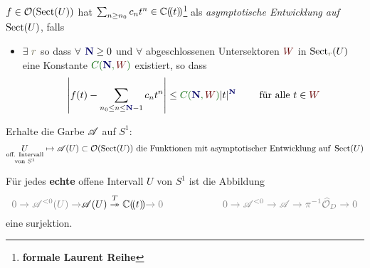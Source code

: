 \begin{defn}
  \def\myN{\textbf{\textcolor{blue!40!black}{N}}}
  \def\mySect{\textcolor{red!40!black}{W}}
  \def\myConst{\textcolor{green!40!black}{C(\myN,\mySect)}}
  $f\in\mathcal{O}(\operatorname{Sect}(U))$
  hat
  $\sum_{n\geq n_0}c_nt^n\in\mathbb{C}(\!(t)\!)$\footnote{\textbf{formale Laurent Reihe}}
  als \emph{asymptotische Entwicklung auf $\operatorname{Sect}(U)$}, falls
  \begin{itemize}
    \item $\exists$ $\textcolor{yellow!30!black}{r}$ so dass
      $\forall$ $\myN\geq0$ und
      $\forall$ abgeschlossenen Untersektoren $\mySect$ in
      $\Sect_{\textcolor{yellow!30!black}{r}}(U)$
      \\eine Konstante $\myConst$ existiert, so dass
      \[
        \left|
          f(t)-\sum_{n_0\leq n\leq\myN-1}c_nt^n
        \right|
        \leq \myConst|t|^{\myN} \qquad \text{ für alle } t\in \mySect
      \]

      \begin{comment}
        oder äquivalent:
        $\lim_{z\to0,z\in{\mySect}}|t|^{-(\myN-1)}
          \left|
            f(t)-\sum_{n_0\leq n\leq \myN-1}c_nt^n
          \right|=0$
      \end{comment}
  \end{itemize}
  Erhalte die Garbe $\mathscr{A}$ auf $S^1$:
  \[
    \underset{\text{von } S^1}{\underset{\text{off. Intervall}}{U}}
    \mapsto\mathscr{A}(U)
    \subset\mathcal{O}(\operatorname{Sect}(U)) \text{ die Funktionen mit asymptotischer
    Entwicklung auf } \operatorname{Sect}(U)
  \]
\end{defn}
\begin{llem}
  Für jedes \textbf{echte} offene Intervall $U$ von $S^1$ ist die Abbildung
  \[
    \textcolor{gray}{0\to \sA^{<0}(U) \to}
    \sA(U) \overset{T}\twoheadrightarrow \C(\!(t)\!)
    \textcolor{gray}{\to0}
    \qquad
    \qquad
    \qquad
    \textcolor{gray}{0\to \sA^{<0} \to
    \sA \to \pi^{-1}\hat\cO_{D}
    \to0}
  \]
  eine surjektion.
\end{llem}
